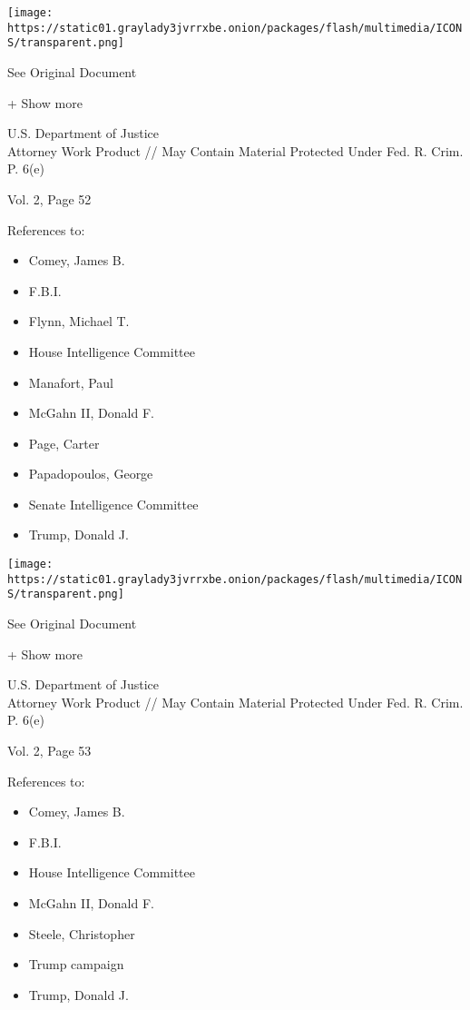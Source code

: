 \protect\hyperlink{}{}

\texttt{[image: https://static01.graylady3jvrrxbe.onion/packages/flash/multimedia/ICONS/transparent.png]}

See Original Document

+ Show more

U.S. Department of Justice\\
Attorney Work Product // May Contain Material Protected Under Fed. R.
Crim. P. 6(e)

Vol. 2, Page 52

References to:

\begin{itemize}
\tightlist
\item
  Comey, James B.
\item
  F.B.I.
\item
  Flynn, Michael T.
\item
  House Intelligence Committee
\item
  Manafort, Paul 
\item
  McGahn II, Donald F.
\item
  Page, Carter
\item
  Papadopoulos, George
\item
  Senate Intelligence Committee
\item
  Trump, Donald J.
\end{itemize}

\protect\hyperlink{}{}

\texttt{[image: https://static01.graylady3jvrrxbe.onion/packages/flash/multimedia/ICONS/transparent.png]}

See Original Document

+ Show more

U.S. Department of Justice\\
Attorney Work Product // May Contain Material Protected Under Fed. R.
Crim. P. 6(e)

Vol. 2, Page 53

References to:

\begin{itemize}
\tightlist
\item
  Comey, James B.
\item
  F.B.I.
\item
  House Intelligence Committee
\item
  McGahn II, Donald F.
\item
  Steele, Christopher
\item
  Trump campaign
\item
  Trump, Donald J.
\end{itemize}

